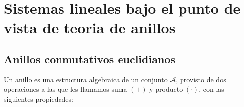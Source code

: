 
\chapter{Sistemas  lineales bajo el punto de vista de teoria de anillos}


    \section{Anillos conmutativos euclidianos}

        Un anillo es una estructura algebraica de un conjunto $\mathcal{A}$, provisto de dos operaciones a las que les llamamos suma $(+)$ y producto $(\cdot)$, con las siguientes propiedades:

